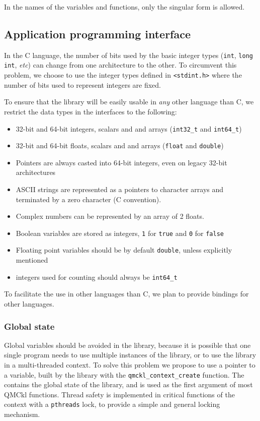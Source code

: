 In the  names of  the variables and  functions, only the singular
form is allowed.

\subsection{Application programming interface}

In the C language, the number of bits used by the basic integer types
(\texttt{int}, \texttt{long int}, \textit{etc}) can
change from one architecture to the other. To circumvent this
problem, we choose to use the integer types defined in
\texttt{<stdint.h>} where the number of bits used to represent
integers are fixed.

To ensure that the library will be easily usable in \emph{any} other
language than C, we restrict the data types in the interfaces to the
following:
\begin{itemize}
\item 32-bit and 64-bit integers, scalars and and arrays
  (\texttt{int32_t} and \texttt{int64_t})
\item 32-bit and 64-bit floats, scalars and and arrays
  (\texttt{float} and \texttt{double})
\item Pointers are always casted into 64-bit integers, even on legacy 32-bit architectures
\item ASCII strings are represented as a pointers to character arrays
  and terminated by a zero character (C convention).
\item Complex numbers can be represented by an array of 2 floats.
\item Boolean variables are stored as integers, \texttt{1} for
\texttt{true} and \texttt{0} for \texttt{false}
\item Floating point variables should be by default
\texttt{double}, unless explicitly mentioned
\item integers used for counting should always be \texttt{int64_t}
\end{itemize}

To facilitate the  use in other languages than C, we plan to provide 
bindings for other languages.


\subsubsection{Global state}

Global variables should  be avoided in the library,  because it is
possible that one  single program needs to  use multiple instances
of the library, or to use the library in a multi-threaded context.
To solve this  problem we propose to use a pointer
to a {\context}  variable,  built   by  the  library   with  the
\texttt{qmckl_context_create} function. The
{\context} contains the global state of the library, and is used as
the first argument of most \ac{QMCkl} functions. Thread safety is 
implemented in critical functions of the context with a
\texttt{pthreads} lock, to provide a simple and general locking
mechanism.

